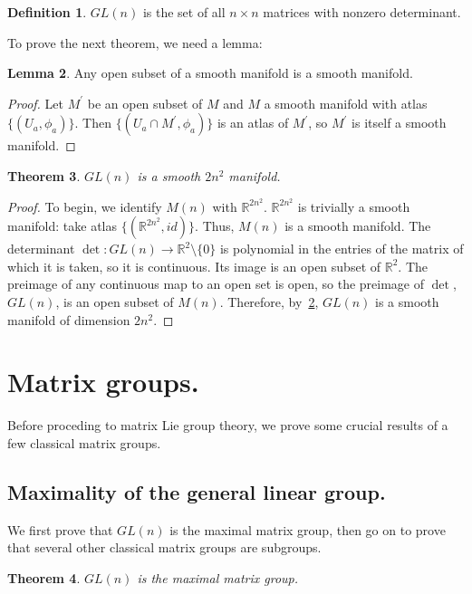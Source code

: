 \documentclass[12pt]{article}
\newcommand{\R}{\mathbb{R}}
\newtheorem{them}{Theorem}[section]
\theoremstyle{definition}
\theoremstyle{definition}
\theoremstyle{definition}
\newtheorem{lem}[them]{Lemma}
\theoremstyle{definition}
\theoremstyle{definition}
\newtheorem{defn}[them]{Definition}
\theoremstyle{definition}
\theoremstyle{definition}
\theoremstyle{definition}
\begin{document}
\begin{defn}
    \textbf{$GL(n)$} is the set of all
    $n \times n$ matrices with nonzero determinant. 
\end{defn}

\par{To prove the next theorem, we need a lemma:}

\begin{lem}\label{lem:smooth} Any open subset of a smooth manifold
is a smooth manifold.\end{lem}
\begin{proof}
Let $M^\prime$ be an open subset of $M$ and
$M$ a smooth manifold with atlas $\{(U_a,
\phi_a)\}$. Then $\{(U_a \cap M^\prime, \phi_a)\}$ is
an atlas of $M^\prime$, so $M^\prime$ is
itself a smooth manifold.
\end{proof}

\begin{them}$GL(n)$ is a smooth $2n^2$
manifold.\end{them} 
\begin{proof}
To begin, we identify $M(n)$ with $\R^{2n^2}$.
$\R^{2n^2}$ is trivially a smooth manifold: take
atlas $\{(\R^{2n^2}, id)\}$. Thus, $M(n)$ is a
smooth manifold. The determinant $\det: GL(n) \to
\R^2 \setminus \{0\}$ is polynomial in the entries
of the matrix of which it is taken, so it is
continuous. Its image is an open subset of $\R^2$.
The preimage of any continuous map to an open set
is open, so the preimage of $\det$,
$GL(n)$, is an open subset of $M(n)$. Therefore,
by~\ref{lem:smooth}, $GL(n)$ is a smooth manifold of
dimension $2n^2$.
\end{proof}

\section{Matrix groups.}

\par{Before proceding to matrix Lie group theory, we prove some crucial results of a few classical matrix groups.}

\subsection{Maximality of the general linear group.}

\par{We first prove that $GL(n)$ is the maximal matrix group, then go on to prove that several other classical matrix groups are subgroups.}
\begin{them}
    $GL(n)$ is the maximal matrix group.
\end{them}
\end{document}
